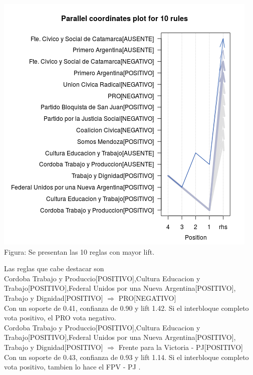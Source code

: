 \documentclass{endm}
\begin{document}
\begin{center}
\includegraphics[scale=0.5]{graficos/paracoordFrPartidos.png} \\
\scriptsize{Figura: Se presentan las 10 reglas con mayor lift.} \\
\end{center} 

Las reglas que cabe destacar son \\

{Cordoba Trabajo y Produccio[POSITIVO],Cultura Educacion y Trabajo[POSITIVO],Federal Unidos por una Nueva Argentina[POSITIVO],     Trabajo y Dignidad[POSITIVO]} $\Longrightarrow$ {PRO[NEGATIVO]}  \\

Con un soporte de 0.41, confianza de  0.90 y lift 1.42. Si el interbloque completo vota positivo, el PRO vota negativo. \\

{Cordoba Trabajo y Produccio[POSITIVO],Cultura Educacion y Trabajo[POSITIVO],Federal Unidos por una Nueva Argentina[POSITIVO], Trabajo y Dignidad[POSITIVO]} $\Longrightarrow$ {Frente para la Victoria - PJ[POSITIVO]}  \\

Con un soporte de 0.43, confianza de  0.93 y lift 1.14. Si el interbloque completo vota positivo, tambien lo hace el FPV - PJ . \\
\end{document}
